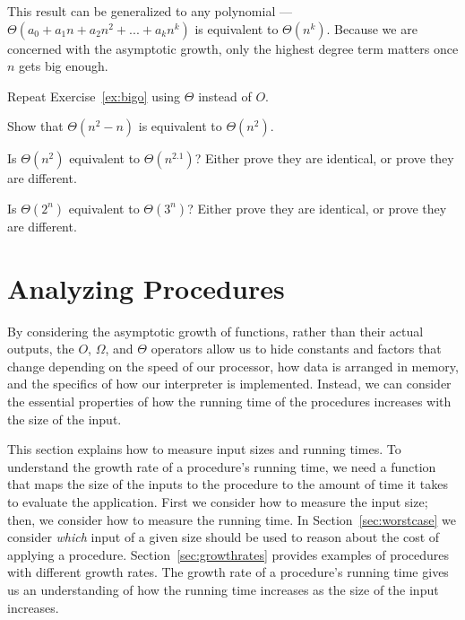 \begin{schemeregion}
This result can be generalized to any polynomial --- $\Theta(a_0 + a_1 n + a_2 n^2 + ... + a_kn^k)$ is equivalent to $\Theta(n^k)$.  Because we are concerned with the asymptotic growth, only the highest degree term matters once $n$ gets big enough.  

\begin{shortexercise}
Repeat Exercise~\ref{ex:bigo} using $\Theta$ instead of $O$.
\end{shortexercise}
\begin{shortexercise}\label{exercise:thetan} 
Show that $\Theta(n^2-n)$ is equivalent to $\Theta(n^2)$.
\end{shortexercise}
\begin{shortexercise}\goldstar 
Is $\Theta(n^2)$ equivalent to $\Theta(n^{2.1})$?  Either prove they are identical, or prove they are different.
\end{shortexercise}
\begin{shortexercise}\goldstar 
Is $\Theta(2^n)$ equivalent to $\Theta(3^n)$?  Either prove they are identical, or prove they are different.
\end{shortexercise}

  
\section{Analyzing Procedures}\label{sec:analyzing}

By considering the asymptotic growth of functions, rather than their actual outputs, the $O$, $\Omega$, and $\Theta$ operators allow us to hide constants and factors that change depending on the speed of our processor, how data is arranged in memory, and the specifics of how our interpreter is implemented.  Instead, we can consider the essential properties of how the running time of the procedures increases with the size of the input.

This section explains how to measure input sizes and running times. To understand the growth rate of a procedure's running time, we need a function that maps the size of the inputs to the procedure to the amount of time it takes to evaluate the application.  First we consider how to measure the input size; then, we consider how to measure the running time.  In Section~\ref{sec:worstcase} we consider \emph{which} input of a given size should be used to reason about the cost of applying a procedure.  Section~\ref{sec:growthrates} provides examples of procedures with different growth rates.  The growth rate of a procedure's running time gives us an understanding of how the running time increases as the size of the input increases. 


\end{schemeregion}
